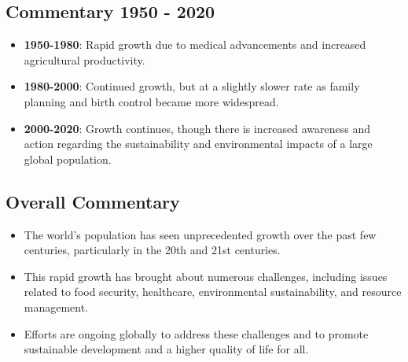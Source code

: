 \subsection*{Commentary 1950 - 2020}
\begin{itemize}
    \item \textbf{1950-1980}: Rapid growth due to medical advancements and increased agricultural productivity.
    \item \textbf{1980-2000}: Continued growth, but at a slightly slower rate as family planning and birth control became more widespread.
    \item \textbf{2000-2020}: Growth continues, though there is increased awareness and action regarding the sustainability and environmental impacts of a large global population.
\end{itemize}

\subsection*{Overall Commentary}
\begin{itemize}
    \item The world’s population has seen unprecedented growth over the past few centuries, particularly in the 20th and 21st centuries.
    \item This rapid growth has brought about numerous challenges, including issues related to food security, healthcare, environmental sustainability, and resource management.
    \item Efforts are ongoing globally to address these challenges and to promote sustainable development and a higher quality of life for all.
\end{itemize}
